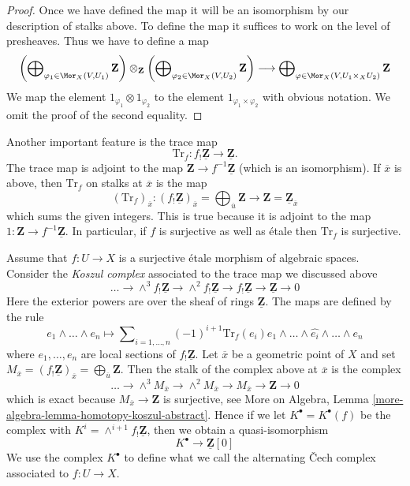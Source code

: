\begin{proof}
Once we have defined the map it will be an isomorphism by our description
of stalks above. To define the map it suffices to work on the level of
presheaves. Thus we have to define a map
$$
\left(\bigoplus\nolimits_{\varphi_1 \in \Mor_X(V, U_1)} \mathbf{Z}\right)
\otimes_{\mathbf{Z}}
\left(\bigoplus\nolimits_{\varphi_2 \in \Mor_X(V, U_2)} \mathbf{Z}\right)
\longrightarrow
\bigoplus\nolimits_{\varphi \in \Mor_X(V, U_1 \times_X U_2)}
\mathbf{Z}
$$
We map the element $1_{\varphi_1} \otimes 1_{\varphi_2}$ to the element
$1_{\varphi_1 \times \varphi_2}$ with obvious notation. We omit the proof
of the second equality.
\end{proof}

\noindent
Another important feature is the trace map
$$
\text{Tr}_f : f_!\underline{\mathbf{Z}} \longrightarrow \underline{\mathbf{Z}}.
$$
The trace map is adjoint to the
map $\mathbf{Z} \to f^{-1}\underline{\mathbf{Z}}$ (which is an isomorphism).
If $\overline{x}$ is above, then $\text{Tr}_f$ on stalks at $\overline{x}$
is the map
$$
(\text{Tr}_f)_{\overline{x}} :
(f_!\underline{\mathbf{Z}})_{\overline{x}} =
\bigoplus\nolimits_{\overline{u}} \mathbf{Z}
\longrightarrow
\mathbf{Z} = \underline{\mathbf{Z}}_{\overline{x}}
$$
which sums the given integers. This is true because it is adjoint to the map
$1 : \mathbf{Z} \to f^{-1}\underline{\mathbf{Z}}$. In particular, if
$f$ is surjective as well as \'etale then $\text{Tr}_f$ is surjective.

\medskip\noindent
Assume that $f : U \to X$ is a surjective \'etale
morphism of algebraic spaces. Consider the {\it Koszul complex}
associated to the trace map we discussed above
$$
\ldots \to \wedge^3f_!\underline{\mathbf{Z}} \to
\wedge^2f_!\underline{\mathbf{Z}} \to f_!\underline{\mathbf{Z}} \to
\underline{\mathbf{Z}} \to 0
$$
Here the exterior powers are over the sheaf of rings $\underline{\mathbf{Z}}$.
The maps are defined by the rule
$$
e_1 \wedge \ldots \wedge e_n \longmapsto
\sum\nolimits_{i = 1, \ldots, n} (-1)^{i + 1}
\text{Tr}_f(e_i)
e_1 \wedge \ldots \wedge \widehat{e_i} \wedge \ldots \wedge e_n
$$
where $e_1, \ldots, e_n$ are local sections of $f_!\underline{\mathbf{Z}}$.
Let $\overline{x}$ be a geometric point of $X$ and set
$M_{\overline{x}} = (f_!\underline{\mathbf{Z}})_{\overline{x}} =
\bigoplus_{\overline{u}} \mathbf{Z}$. Then the stalk of the complex above at
$\overline{x}$ is the complex
$$
\ldots \to \wedge^3 M_{\overline{x}} \to \wedge^2 M_{\overline{x}}
\to M_{\overline{x}} \to \mathbf{Z} \to 0
$$
which is exact because $M_{\overline{x}} \to \mathbf{Z}$ is surjective, see
More on Algebra, Lemma \ref{more-algebra-lemma-homotopy-koszul-abstract}.
Hence if we let $K^\bullet = K^\bullet(f)$ be the complex with
$K^i = \wedge^{i + 1}f_!\underline{\mathbf{Z}}$, then we obtain a
quasi-isomorphism
\begin{equation}
\label{equation-quasi-isomorphism}
K^\bullet \longrightarrow \underline{\mathbf{Z}}[0]
\end{equation}
We use the complex $K^\bullet$ to define what we call
the alternating {\v C}ech complex associated to $f : U \to X$.

